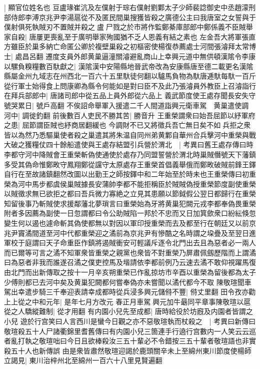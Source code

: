 |{
	顯官位姓名也}
豆盧瑑崔沆及左僕射于琮右僕射劉鄴太子少師裴諗御史中丞趙濛刑部侍郎李溥京兆尹李湯扈從不及匿民間巢搜獲皆殺之廣德公主曰我唐室之女誓與于僕射俱死執賊刃不置賊并殺之盧尸戮之於市將作監鄭綦庫部郎中鄭係義不臣賊舉家自殺|{
	唐屢更喪亂至于廣明舉家殉國猶不乏人恩義有結之素也}
左金吾大將軍張直方雖臣於巢多納亡命匿公卿於複壁巢殺之初樞密使楊復恭薦處士河間張濬拜太常博士|{
	處昌呂翻}
遷度支員外郎黄巢逼潼關濬避亂商山上幸興元道中無供頓漢隂令李康以騾負糗糧數百馱獻之|{
	漢隂漢中安陽縣地晉武帝改為安康縣唐至德二載更名漢隂縣屬金州九域志在州西北一百六十五里馱徒何翻以驢馬負物為馱唐逓馱每馱一百斤}
從行軍士始得食上問康卿為縣令何能如是對曰臣不及此乃張濬員外教臣上召濬詣行在拜兵部郎中|{
	唐諸司郎中從五品上員外郎從六品上}
義武節度使王處存聞長安失守號哭累日|{
	號戶高翻}
不俟詔命舉軍入援遣二千人間道詣興元衛車駕　黄巢遣使調河中|{
	調徙釣翻}
前後數百人吏民不勝其苦|{
	勝音升}
王重榮謂衆曰始吾屈節以紓軍府之患|{
	屈節謂臣賊也紓商居翻緩也}
今調財不已又將徵兵吾亡無日矣不如兵拒之衆皆以為然乃悉驅巢使者殺之巢遣其將朱温自同州弟黄鄴自華州合兵擊河中重榮與戰大破之獲糧仗四十餘船遣使與王處存結盟引兵營於渭北　|{
	考異曰舊王處存傳曰時李都守河中降賊會王重榮斬偽使通使於處存乃同盟誓營於渭北時巢賊僭號天下藩鎮多受其偽命惟鄭畋守鳳翔鄭從讜守太原處存王重榮首倡義舉俄而鄭畋破賊前鋒王鐸自行在至故諸鎮翻然改圖以出勤王之師按鐸中和二年始至於時未也王重榮傳曰初重榮為河中馬步都虞侯巢賊據長安蒲帥李都不能拒稱臣於賊賊偽授重榮節度副使重榮以賊徵求無已欲拒之都曰吾兵微力寡絶之立見其患願以節鉞假公翌日都歸行在重榮知留後事乃斬賊使求援鄰藩北夢瑣言曰重榮始為牙將黄巢犯闕元戎李都奉偽畏重榮附者多因薦為副使一日忽謂都曰令公助賊陷一邦於不忠而又日加箕歛衆口紛紜倏忽變生何以遏也遽命斬其偽使都無以對因以軍印授重榮而去及都至行在朝廷又以前京兆尹竇潏間道至河中代都重榮迎之潏前為京兆尹有慘酷之名時謂之垜疊及至翌日進軍校于庭謂曰天子命重臣作鎮將遏賊衝安可輕議斥逐令北門出去且為惡者必一兩人而已爾等可言之潏不知軍衆皆重榮之親黨也衆皆不對重榮乃屏肅佩劔歷階而上謂潏曰為惡者非我而誰遂召潏之僕吏控馬及堦請依李都前例乃云速去潏不敢仰視躍馬復由北門而出新傳取之按十一月辛亥朔重榮已作亂掠坊市辛酉以重榮為留後都為太子少傅則都已去河中矣及黄巢犯闕都何嘗奉偽亦未嘗聞以潏代都今不取}
陳敬瑄聞車駕出幸遣步騎三千奉迎表請幸成都時從兵浸多興元儲偫不豐|{
	偫丈里翻}
田令孜亦勸上上從之中和元年|{
	是年七月方改元}
春正月車駕興元加牛朂同平章事陳敬瑄以扈從之人驕縱難制|{
	從才用翻}
有内園小兒先至成都|{
	唐時給役於坊廐及内園者皆謂之小兒}
遊於行宫笑曰人言西川是蠻今日觀之亦不惡敬瑄執而杖殺之　|{
	考異曰新傳曰敬瑄殺五十人尸諸衢錦里耆舊傳曰有内園小兒三箇連手行遶行宫數内一人笑云云巡者亂打執之敬瑄咄曰今日且欲棒殺汝三五十輩必不令錯按三五十輩者敬瑄語也非實殺五十人也新傳誤}
由是衆皆肅然敬瑄迎謁於鹿頭關辛未上至綿州東川節度使楊師立謁見|{
	東川治梓州北至綿州一百六十八里見賢遍翻}
